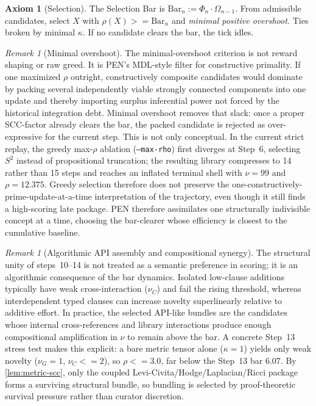 \documentclass[11pt,a4paper]{article}
\def\leq{<=}%
\def\geq{>=}%
\theoremstyle{plain}
\theoremstyle{definition}
\newtheorem{axiom}[theorem]{Axiom}
\theoremstyle{remark}
\newtheorem{remark}[theorem]{Remark}
\begin{document}
\begin{axiom}[Selection]
\label{ax:selection}
The Selection Bar is $\mathrm{Bar}_n := \Phi_n \cdot \Omega_{n-1}$.
From admissible candidates, select $X$ with $\rho(X) \geq \mathrm{Bar}_n$ and \emph{minimal positive overshoot.}
Ties broken by minimal $\kappa$.
If no candidate clears the bar, the tick idles.
\end{axiom}

\begin{remark}[Minimal overshoot]
The minimal-overshoot criterion is not reward shaping or raw greed.
It is PEN's MDL-style filter for constructive primality.
If one maximized $\rho$ outright, constructively composite candidates would dominate by packing several independently viable strongly connected components into one update and thereby importing surplus inferential power not forced by the historical integration debt.
Minimal overshoot removes that slack: once a proper SCC-factor already clears the bar, the packed candidate is rejected as over-expressive for the current step.
This is not only conceptual.
In the current strict replay, the greedy max-$\rho$ ablation (\texttt{--max-rho}) first diverges at Step~6, selecting $S^2$ instead of propositional truncation; the resulting library compresses to 14 rather than 15 steps and reaches an inflated terminal shell with $\nu=99$ and $\rho=12.375$.
Greedy selection therefore does not preserve the one-constructively-prime-update-at-a-time interpretation of the trajectory, even though it still finds a high-scoring late package.
PEN therefore assimilates one structurally indivisible concept at a time, choosing the bar-clearer whose efficiency is closest to the cumulative baseline.
\end{remark}

\begin{remark}[Algorithmic API assembly and compositional synergy]
\label{rem:api-assembly}
The structural unity of steps~10--14 is not treated as a semantic preference in scoring; it is an algorithmic consequence of the bar dynamics.
Isolated low-clause additions typically have weak cross-interaction ($\nu_C$) and fail the rising threshold, whereas interdependent typed clauses can increase novelty superlinearly relative to additive effort.
In practice, the selected API-like bundles are the candidates whose internal cross-references and library interactions produce enough compositional amplification in $\nu$ to remain above the bar.
A concrete Step~13 stress test makes this explicit: a bare metric tensor alone ($\kappa=1$) yields only weak novelty ($\nu_G=1$, $\nu_C\leq 2$), so $\rho\leq 3.0$, far below the Step~13 bar $6.07$.
By \cref{lem:metric-scc}, only the coupled Levi-Civita/Hodge/Laplacian/Ricci package forms a surviving structural bundle, so bundling is selected by proof-theoretic survival pressure rather than curator discretion.
\end{remark}
\end{document}
